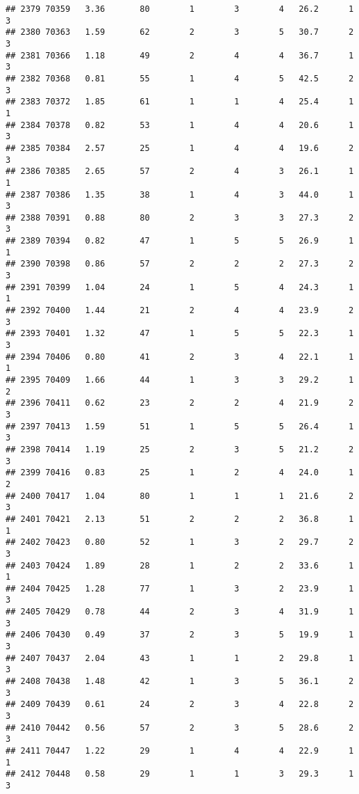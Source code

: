 \documentclass[
]{article}
\begin{document}
\begin{verbatim}
## 2379 70359   3.36       80        1        3        4   26.2      1      3
## 2380 70363   1.59       62        2        3        5   30.7      2      3
## 2381 70366   1.18       49        2        4        4   36.7      1      3
## 2382 70368   0.81       55        1        4        5   42.5      2      3
## 2383 70372   1.85       61        1        1        4   25.4      1      1
## 2384 70378   0.82       53        1        4        4   20.6      1      3
## 2385 70384   2.57       25        1        4        4   19.6      2      3
## 2386 70385   2.65       57        2        4        3   26.1      1      1
## 2387 70386   1.35       38        1        4        3   44.0      1      3
## 2388 70391   0.88       80        2        3        3   27.3      2      3
## 2389 70394   0.82       47        1        5        5   26.9      1      1
## 2390 70398   0.86       57        2        2        2   27.3      2      3
## 2391 70399   1.04       24        1        5        4   24.3      1      1
## 2392 70400   1.44       21        2        4        4   23.9      2      3
## 2393 70401   1.32       47        1        5        5   22.3      1      3
## 2394 70406   0.80       41        2        3        4   22.1      1      1
## 2395 70409   1.66       44        1        3        3   29.2      1      2
## 2396 70411   0.62       23        2        2        4   21.9      2      3
## 2397 70413   1.59       51        1        5        5   26.4      1      3
## 2398 70414   1.19       25        2        3        5   21.2      2      3
## 2399 70416   0.83       25        1        2        4   24.0      1      2
## 2400 70417   1.04       80        1        1        1   21.6      2      3
## 2401 70421   2.13       51        2        2        2   36.8      1      1
## 2402 70423   0.80       52        1        3        2   29.7      2      3
## 2403 70424   1.89       28        1        2        2   33.6      1      1
## 2404 70425   1.28       77        1        3        2   23.9      1      3
## 2405 70429   0.78       44        2        3        4   31.9      1      3
## 2406 70430   0.49       37        2        3        5   19.9      1      3
## 2407 70437   2.04       43        1        1        2   29.8      1      3
## 2408 70438   1.48       42        1        3        5   36.1      2      3
## 2409 70439   0.61       24        2        3        4   22.8      2      3
## 2410 70442   0.56       57        2        3        5   28.6      2      3
## 2411 70447   1.22       29        1        4        4   22.9      1      1
## 2412 70448   0.58       29        1        1        3   29.3      1      3

\end{verbatim}
\end{document}
